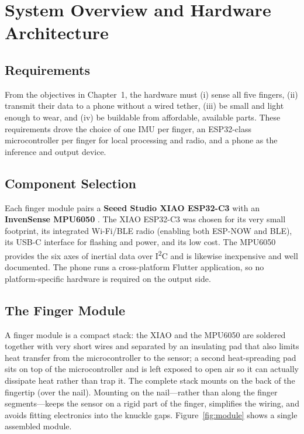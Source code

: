 \chapter{System Overview and Hardware Architecture}

\section{Requirements}

From the objectives in Chapter~1, the hardware must (i) sense all five fingers,
(ii) transmit their data to a phone without a wired tether, (iii) be small and
light enough to wear, and (iv) be buildable from affordable, available parts.
These requirements drove the choice of one IMU per finger, an ESP32-class
microcontroller per finger for local processing and radio, and a phone as the
inference and output device.

\section{Component Selection}

Each finger module pairs a \textbf{Seeed Studio XIAO ESP32-C3} \cite{xiao} with
an \textbf{InvenSense MPU6050} \cite{mpu6050}. The XIAO ESP32-C3 was chosen for
its very small footprint, its integrated Wi-Fi/BLE radio (enabling both ESP-NOW
and BLE), its USB-C interface for flashing and power, and its low cost. The
MPU6050 provides the six axes of inertial data over I\textsuperscript{2}C and is
likewise inexpensive and well documented. The phone runs a cross-platform
Flutter application, so no platform-specific hardware is required on the output
side.

\section{The Finger Module}

A finger module is a compact stack: the XIAO and the MPU6050 are soldered
together with very short wires and separated by an insulating pad that also
limits heat transfer from the microcontroller to the sensor; a second
heat-spreading pad sits on top of the microcontroller and is left exposed to
open air so it can actually dissipate heat rather than trap it. The complete
stack mounts on the back of the fingertip (over the nail). Mounting on the
nail—rather than along the finger segments—keeps the sensor on a rigid part of
the finger, simplifies the wiring, and avoids fitting electronics into the
knuckle gaps. Figure~\ref{fig:module} shows a single assembled module.

